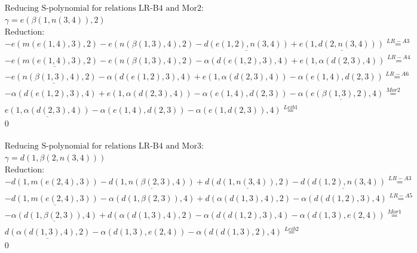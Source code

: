 \documentclass[11pt]{amsart}
\begin{document}
\begin{align*} 
& \text{Reducing S-polynomial for relations LR-B4 and Mor2:} \\ 
& \gamma = e(\beta(1,n(3,4)),2) \\ 
& \text{Reduction}: \\& - e(m(e(1,4),3),2) - e(n(\beta(1,3),4),2) - \underline{d(e(1,2),n(3,4))} + \underline{e(1,d(2,n(3,4)))} \stackrel{ LR-A3 }{=}  \\ 
& - \underline{e(m(e(1,4),3),2)} - e(n(\beta(1,3),4),2) - \alpha(d(e(1,2),3),4) + e(1,\alpha(d(2,3),4)) \stackrel{ LR-A4 }{=}  \\ 
& - \underline{e(n(\beta(1,3),4),2)} - \alpha(d(e(1,2),3),4) + e(1,\alpha(d(2,3),4)) - \alpha(e(1,4),d(2,3)) \stackrel{ LR-A6 }{=}  \\ 
& - \alpha(d(e(1,2),3),4) + e(1,\alpha(d(2,3),4)) - \alpha(e(1,4),d(2,3)) - \underline{\alpha(e(\beta(1,3),2),4)} \stackrel{ Mor2 }{=}  \\ 
&\underline{e(1,\alpha(d(2,3),4))} - \alpha(e(1,4),d(2,3)) - \alpha(e(1,d(2,3)),4) \stackrel{ Leib1 }{=}  \\ 
&0\\ 
\end{align*} 
 
\begin{align*} 
& \text{Reducing S-polynomial for relations LR-B4 and Mor3:} \\ 
& \gamma = d(1,\beta(2,n(3,4))) \\ 
& \text{Reduction}: \\& - d(1,m(e(2,4),3)) - \underline{d(1,n(\beta(2,3),4))} + \underline{d(d(1,n(3,4)),2)} - \underline{d(d(1,2),n(3,4))} \stackrel{ LR-A3 }{=}  \\ 
& - \underline{d(1,m(e(2,4),3))} - \alpha(d(1,\beta(2,3)),4) + d(\alpha(d(1,3),4),2) - \alpha(d(d(1,2),3),4) \stackrel{ LR-A5 }{=}  \\ 
& - \underline{\alpha(d(1,\beta(2,3)),4)} + d(\alpha(d(1,3),4),2) - \alpha(d(d(1,2),3),4) - \alpha(d(1,3),e(2,4)) \stackrel{ Mor1 }{=}  \\ 
&\underline{d(\alpha(d(1,3),4),2)} - \alpha(d(1,3),e(2,4)) - \alpha(d(d(1,3),2),4) \stackrel{ Leib2 }{=}  \\ 
&0\\ 
\end{align*} 
 
\end{document}
